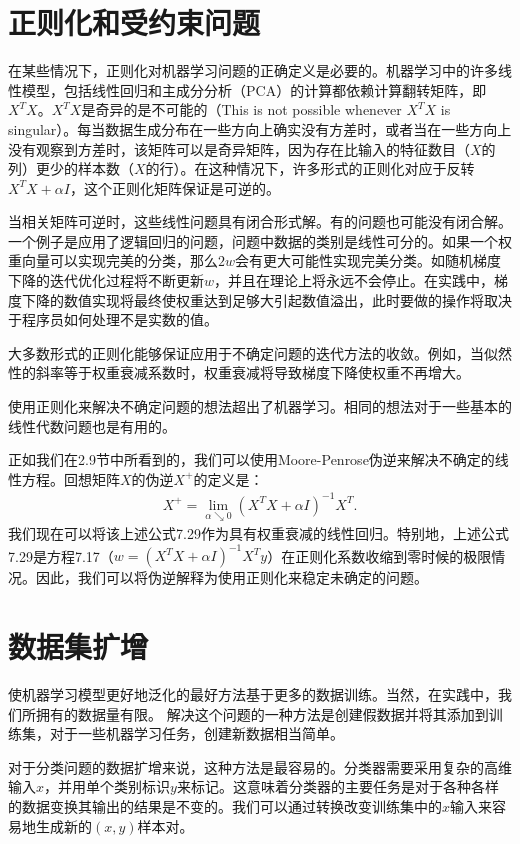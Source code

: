 \section{正则化和受约束问题}

在某些情况下，正则化对机器学习问题的正确定义是必要的。机器学习中的许多线性模型，包括线性回归和主成分分析（PCA）的计算都依赖计算翻转矩阵，即$X^T X$。$X^T X$是奇异的是不可能的（This is not possible whenever $X^T X$ is singular）。每当数据生成分布在一些方向上确实没有方差时，或者当在一些方向上没有观察到方差时，该矩阵可以是奇异矩阵，因为存在比输入的特征数目（$X$的列）更少的样本数（$X$的行）。在这种情况下，许多形式的正则化对应于反转$X^T X + \alpha I$，这个正则化矩阵保证是可逆的。

当相关矩阵可逆时，这些线性问题具有闭合形式解。有的问题也可能没有闭合解。一个例子是应用了逻辑回归的问题，问题中数据的类别是线性可分的。如果一个权重向量可以实现完美的分类，那么$2w$会有更大可能性实现完美分类。如随机梯度下降的迭代优化过程将不断更新$w$，并且在理论上将永远不会停止。在实践中，梯度下降的数值实现将最终使权重达到足够大引起数值溢出，此时要做的操作将取决于程序员如何处理不是实数的值。

大多数形式的正则化能够保证应用于不确定问题的迭代方法的收敛。例如，当似然性的斜率等于权重衰减系数时，权重衰减将导致梯度下降使权重不再增大。

使用正则化来解决不确定问题的想法超出了机器学习。相同的想法对于一些基本的线性代数问题也是有用的。

正如我们在2.9节中所看到的，我们可以使用Moore-Penrose伪逆来解决不确定的线性方程。回想矩阵$X$的伪逆$X^+$的定义是：
$$
\begin{aligned}
	X^+ = \lim_{\alpha \searrow 0} (X^T X + \alpha I)^{-1} X^T.
\end{aligned}
$$
我们现在可以将该上述公式7.29作为具有权重衰减的线性回归。特别地，上述公式7.29是方程7.17（$w = (X^TX + \alpha I)^{-1}X^Ty$）在正则化系数收缩到零时候的极限情况。因此，我们可以将伪逆解释为使用正则化来稳定未确定的问题。

\section{数据集扩增}

使机器学习模型更好地泛化的最好方法基于更多的数据训练。当然，在实践中，我们所拥有的数据量有限。 解决这个问题的一种方法是创建假数据并将其添加到训练集，对于一些机器学习任务，创建新数据相当简单。

对于分类问题的数据扩增来说，这种方法是最容易的。分类器需要采用复杂的高维输入$x$，并用单个类别标识$y$来标记。这意味着分类器的主要任务是对于各种各样的数据变换其输出的结果是不变的。我们可以通过转换改变训练集中的$x$输入来容易地生成新的$(x, y)$样本对。

